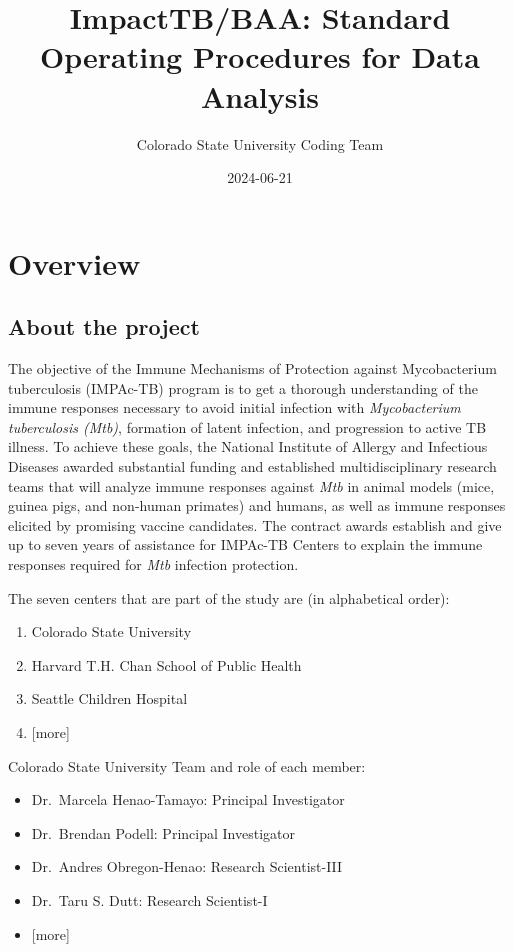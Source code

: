 \documentclass[
]{book}
\title{ImpactTB/BAA: Standard Operating Procedures for Data Analysis}
\author{Colorado State University Coding Team}
\date{2024-06-21}
\providecommand{\tightlist}{%
  \setlength{\itemsep}{0pt}\setlength{\parskip}{0pt}}
\begin{document}
\maketitle

{
\setcounter{tocdepth}{1}
\tableofcontents
}
\hypertarget{overview}{%
\chapter{Overview}\label{overview}}

\hypertarget{about-the-project}{%
\section{About the project}\label{about-the-project}}

The objective of the Immune Mechanisms of Protection against Mycobacterium tuberculosis (IMPAc-TB) program is to get a thorough understanding of the immune responses necessary to avoid initial infection with \emph{Mycobacterium tuberculosis (Mtb)}, formation of latent infection, and progression to active TB illness. To achieve these goals, the National Institute of Allergy and Infectious Diseases awarded substantial funding and established multidisciplinary research teams that will analyze immune responses against \emph{Mtb} in animal models (mice, guinea pigs, and non-human primates) and humans, as well as immune responses elicited by promising vaccine candidates. The contract awards establish and give up to seven years of assistance for IMPAc-TB Centers to explain the immune responses required for \emph{Mtb} infection protection.

The seven centers that are part of the study are (in alphabetical order):

\begin{enumerate}
\def\labelenumi{\arabic{enumi}.}
\tightlist
\item
  Colorado State University
\item
  Harvard T.H. Chan School of Public Health
\item
  Seattle Children Hospital
\item
  {[}more{]}
\end{enumerate}

Colorado State University Team and role of each member:

\begin{itemize}
\tightlist
\item
  Dr.~Marcela Henao-Tamayo: Principal Investigator
\item
  Dr.~Brendan Podell: Principal Investigator
\item
  Dr.~Andres Obregon-Henao: Research Scientist-III
\item
  Dr.~Taru S. Dutt: Research Scientist-I
\item
  {[}more{]}
\end{itemize}
\end{document}
